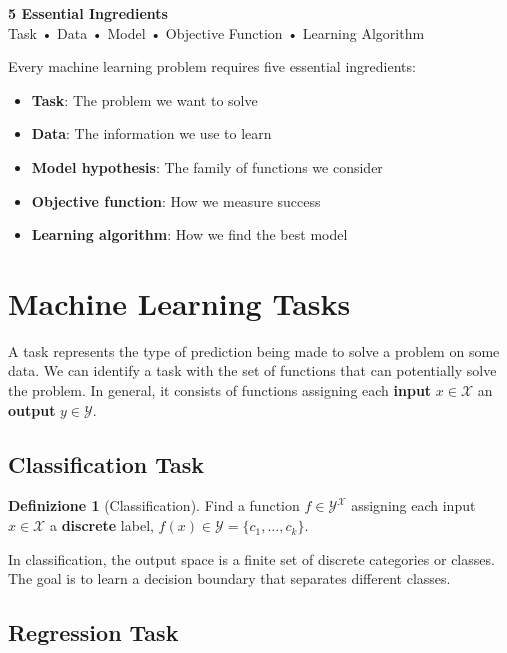\documentclass[11pt,a4paper]{article}
\theoremstyle{definition}
\newtheorem{definition}{Definizione}[section]
\theoremstyle{plain}
\theoremstyle{remark}
\begin{document}
\begin{center}
\colorbox{green!15}{\parbox{0.85\textwidth}{
\centering
\textbf{5 Essential Ingredients}\\[0.2cm]
Task • Data • Model • Objective Function • Learning Algorithm
}}
\end{center}

Every machine learning problem requires five essential ingredients:
\begin{itemize}
    \item \textbf{Task}: The problem we want to solve
    \item \textbf{Data}: The information we use to learn
    \item \textbf{Model hypothesis}: The family of functions we consider
    \item \textbf{Objective function}: How we measure success
    \item \textbf{Learning algorithm}: How we find the best model
\end{itemize}

\section{Machine Learning Tasks}

A task represents the type of prediction being made to solve a problem on some data. We can identify a task with the set of functions that can potentially solve the problem. In general, it consists of functions assigning each \textbf{input} $x \in \mathcal{X}$ an \textbf{output} $y \in \mathcal{Y}$.

\subsection{Classification Task}

\begin{definition}[Classification]
Find a function $f \in \mathcal{Y}^{\mathcal{X}}$ assigning each input $x \in \mathcal{X}$ a \textbf{discrete} label, $f(x) \in \mathcal{Y} = \{c_1, \ldots, c_k\}$.
\end{definition}

In classification, the output space is a finite set of discrete categories or classes. The goal is to learn a decision boundary that separates different classes.

\subsection{Regression Task}
\end{document}
